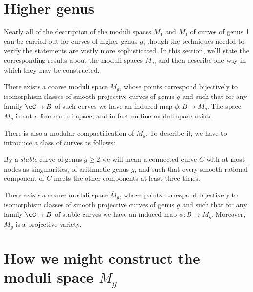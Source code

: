 \section{Higher genus}

Nearly all of the description of the moduli spaces $M_1$ and $\overline M_1$ of curves of genus 1 can be carried out for curves of higher genus $g$,  though the techniques needed to verify the statements are vastly more sophisticated. In this section, we'll state the corresponding results about the moduli spaces $M_g$, and then describe one way in which they may be constructed.

\begin{theorem}\label{moduli}
There exists a coarse moduli space $M_g$, whose points correspond bijectively to isomorphism classes of smooth projective curves of genus $g$ and such that for any family $\cC \to B$ of such curves we have an induced map $\phi : B \to M_g$. The space $M_g$ is not a fine moduli space, and in fact no fine moduli space exists.
\end{theorem}


There is also a modular compactification of $M_g$. To describe it, we have to introduce a class of curves as follows:

\begin{definition}
By a \emph{stable} curve of genus $g \geq 2$ we will mean a connected curve $C$ with at most nodes as singularities, of arithmetic genus $g$, and such that every smooth rational component of $C$ meets the other components at least three times.
\end{definition}



\begin{theorem}\label{stable moduli}
There exists a coarse moduli space $\overline M_g$, whose points correspond bijectively to isomorphism classes of smooth projective curves of genus $g$ and such that for any family $\cC \to B$ of stable curves we have an induced map $\phi : B \to \overline M_g$. Moreover, $\overline M_g$ is a projective variety.
\end{theorem}

\section{How we might construct the moduli space $\overline M_g$}

